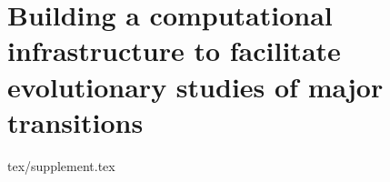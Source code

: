 \chapter{Building a computational infrastructure to facilitate evolutionary studies of major transitions}
\label{ch:infrastructure-appendix}

{tex/supplement.tex}
